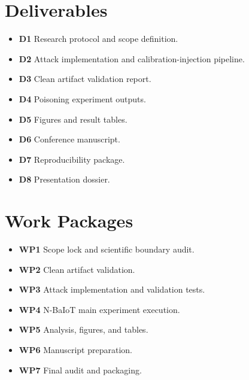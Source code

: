 
\begin{minipage}[t]{0.48\linewidth}
\section{Deliverables}
\begin{itemize}[leftmargin=0pt, itemindent=0pt, label={}]
  \item \textbf{D1} Research protocol and scope definition.
  \item \textbf{D2} Attack implementation and calibration-injection pipeline.
  \item \textbf{D3} Clean artifact validation report.
  \item \textbf{D4} Poisoning experiment outputs.
  \item \textbf{D5} Figures and result tables.
  \item \textbf{D6} Conference manuscript.
  \item \textbf{D7} Reproducibility package.
  \item \textbf{D8} Presentation dossier.
\end{itemize}
\end{minipage}%
\hfill
\begin{minipage}[t]{0.48\linewidth}
\section{Work Packages}
\begin{itemize}[leftmargin=0pt, itemindent=0pt, label={}]
  \item \textbf{WP1} Scope lock and scientific boundary audit.
  \item \textbf{WP2} Clean artifact validation.
  \item \textbf{WP3} Attack implementation and validation tests.
  \item \textbf{WP4} N-BaIoT main experiment execution.
  \item \textbf{WP5} Analysis, figures, and tables.
  \item \textbf{WP6} Manuscript preparation.
  \item \textbf{WP7} Final audit and packaging.
\end{itemize}
\end{minipage}

